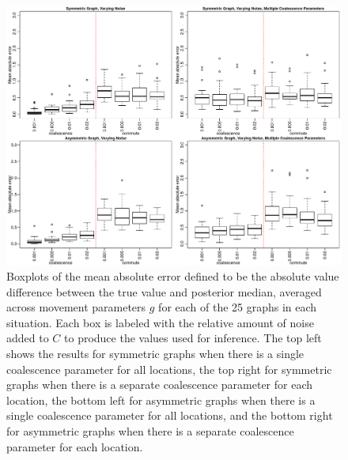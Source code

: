 \documentclass{article}
\begin{document}
\begin{figure}
\centering
\includegraphics[scale=.6]{figs/mult_noise}
\caption{Boxplots of the mean absolute error
defined to be the absolute value difference between the true value and posterior median,
averaged across movement parameters $g$ for each of the 25 graphs in each situation.
Each box is labeled with the relative amount of noise added to $C$ to produce the values used for inference.
The top left shows the results for symmetric graphs 
when there is a single coalescence parameter for all locations,
the top right for symmetric graphs 
when there is a separate coalescence parameter for each location,
the bottom left for asymmetric graphs 
when there is a single coalescence parameter for all locations,
and the bottom right for asymmetric graphs 
when there is a separate coalescence parameter for each location.}
\label{fig:mult_noise}
\end{figure}
\end{document}

